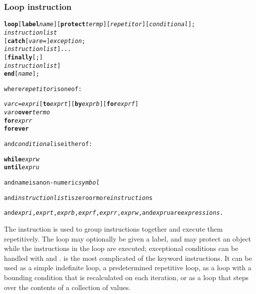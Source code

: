 \subsubsection{Loop instruction}\label{refloop}
\index{,}
\index{,}
\index{,}
\index{,}
\begin{shaded}
\begin{alltt}
\textbf{loop} [\textbf{label} \emph{name}] [\textbf{protect} \emph{termp}] [\emph{repetitor}] [\emph{conditional}];
        \emph{instructionlist}
    [\textbf{catch} [\emph{vare} =] \emph{exception};
        \emph{instructionlist}]...
    [\textbf{finally}[;]
        \emph{instructionlist}]
    \textbf{end} [\emph{name}];

where \emph{repetitor} is one of:

    \emph{varc} = \emph{expri} [\textbf{to} \emph{exprt}] [\textbf{by} \emph{exprb}] [\textbf{for} \emph{exprf}]
    \emph{varo} \textbf{over} \emph{termo}
    \textbf{for} \emph{exprr}
    \textbf{forever}

and \emph{conditional} is either of:

    \textbf{while} \emph{exprw}
    \textbf{until} \emph{expru}

and \emph{name} is a non-numeric \emph{symbol}

and \emph{instructionlist} is zero or more \emph{instruction}s

and \emph{expri}, \emph{exprt}, \emph{exprb}, \emph{exprf}, \emph{exprr}, \emph{exprw}, and \emph{expru} are \emph{expressions}.
\end{alltt}
\end{shaded}
 The  instruction is used to group instructions together
and execute them repetitively.
The loop may optionally be given a label, and may protect an object
while the instructions in the loop are executed; exceptional conditions
can be handled with  and .
  is the most complicated of the \crexx{} keyword
instructions.
It can be used as a simple indefinite loop, a predetermined
repetitive loop, as a loop with a bounding condition that is
recalculated on each iteration, or as a loop that steps over the
contents of a collection of values.
